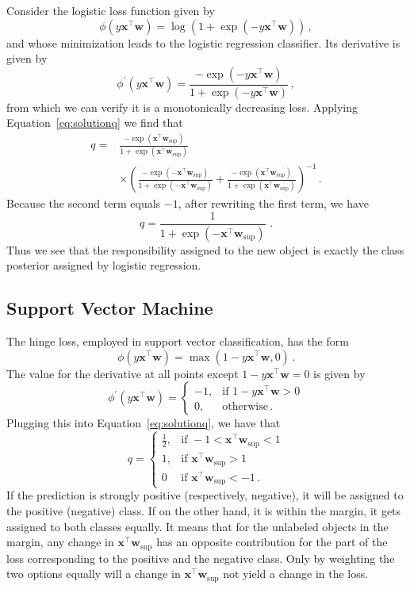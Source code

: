 \documentclass[twoside]{memoir}\usepackage[]{graphicx}\usepackage{xcolor}
\begin{document}
Consider the logistic loss function given by
$$\phi(y \mathbf{x}^\top \mathbf{w})=\log(1+\exp(-y \mathbf{x}^\top \mathbf{w}))\,,$$
and whose minimization leads to the logistic regression classifier. Its derivative is given by
$$\phi^\prime (y\mathbf{x}^\top \mathbf{w}) = \frac{-\exp(-y\mathbf{x}^\top \mathbf{w})}{1+\exp(-y\mathbf{x}^\top \mathbf{w})}\,,$$
from which we can verify it is a monotonically decreasing loss.
Applying Equation~\eqref{eq:solutionq} we find that
\begin{align}
q = & \frac{-\exp(\mathbf{x}^\top \mathbf{w}_\mathrm{sup})}{1+\exp(\mathbf{x}^\top \mathbf{w}_\mathrm{sup})} \nonumber \\
 & \times  \left( \frac{-\exp(-\mathbf{x}^\top \mathbf{w}_\mathrm{sup})}{1+\exp(-\mathbf{x}^\top \mathbf{w}_\mathrm{sup})} + \frac{-\exp(\mathbf{x}^\top \mathbf{w}_\mathrm{sup})}{1+\exp(\mathbf{x}^\top \mathbf{w}_\mathrm{sup})}\right)^{-1} \, . \nonumber
 \end{align}
Because the second term equals $-1$, after rewriting the first term, we have
$$ q = \frac{1}{1+\exp(-\mathbf{x}^\top \mathbf{w}_\mathrm{sup})} \,\, .$$
Thus we see that the responsibility assigned to the new object is exactly the class posterior assigned by logistic regression.

\subsection{Support Vector Machine}
The hinge loss, employed in support vector classification, has the form
$$\phi(y\mathbf{x}^\top \mathbf{w})=\max(1-y \mathbf{x}^\top \mathbf{w},0) \, .$$
The value for the derivative at all points except $1-y \mathbf{x}^\top \mathbf{w}=0$ is given by
$$
\phi^\prime (y \mathbf{x}^\top \mathbf{w}) =
\begin{cases}
-1 ,& \text{if } 1-y \mathbf{x}^\top \mathbf{w}>0\\
0,& \text{otherwise} \, .
\end{cases}
$$
Plugging this into Equation~\eqref{eq:solutionq}, we have that
$$
q =
\begin{cases}
    \frac{1}{2} ,& \text{if } -1 < \mathbf{x}^\top \mathbf{w}_\mathrm{sup} < 1\\
    1,              & \text{if } \mathbf{x}^\top \mathbf{w}_\mathrm{sup} > 1 \\
    0 & \text{if } \mathbf{x}^\top \mathbf{w}_\mathrm{sup} < -1 \, .
\end{cases}
$$
If the prediction is strongly positive (respectively, negative), it will be assigned to the positive (negative) class. If on the other hand, it is within the margin, it gets assigned to both classes equally.
It means that for the unlabeled objects in the margin, any change in $\mathbf{x}^\top \mathbf{w}_\mathrm{sup}$ has an opposite contribution for the part of the loss corresponding to the positive and the negative class. Only by weighting the two options equally will a change in $\mathbf{x}^\top \mathbf{w}_\mathrm{sup}$ not yield a change in the loss.
\end{document}
